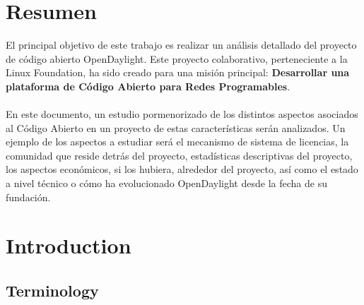 \documentclass[a4paper, 12pt]{book}
\begin{document}
\chapter*{Resumen}
\label{chap:resumen}

El principal objetivo de este trabajo es realizar un análisis detallado del proyecto de código abierto OpenDaylight. Este proyecto colaborativo, perteneciente a la Linux Foundation, ha sido creado para una misión principal: \textbf{Desarrollar una plataforma de Código Abierto para Redes Programables}.\\
\\
En este documento, un estudio pormenorizado de los distintos aspectos asociados al Código Abierto en un proyecto de estas características serán analizados. Un ejemplo de los aspectos a estudiar será el mecanismo de sistema de licencias, la comunidad que reside detrás del proyecto, estadísticas descriptivas del proyecto, los aspectos económicos, si los hubiera, alrededor del proyecto, así como el estado a nivel técnico o cómo ha evolucionado OpenDaylight desde la fecha de su fundación.


\chapter{Introduction}
\label{chap:introduction}

\section{Terminology}
\label{sec:terminology}
\end{document}
